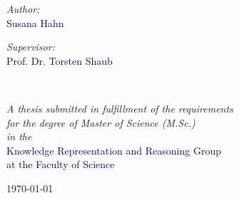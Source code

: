 \begin{titlepage}
\begin{center}
    \vspace*{.005\textheight}
    \begin{minipage}[t]{0.4\textwidth}
    \begin{flushleft} \large
    \emph{Author:}\\
    {\textcolor{darkblue}{Susana Hahn}}\\
    \end{flushleft}
    \end{minipage}
    \begin{minipage}[t]{0.4\textwidth}
    \begin{flushright} \large
    \emph{Supervisor:} \\
    {\textcolor{darkblue}{Prof. Dr. Torsten Shaub}}
    \end{flushright}
    \end{minipage}\\[2.3cm]
     
    \vfill
    
    \large \textit{A thesis submitted in fulfillment of the requirements\\ for the degree of Master of Science (M.Sc.)}\\[0.3cm]
    \textit{in the}\\[0.4cm]
    \textcolor{darkblue}{Knowledge Representation and Reasoning Group \\ at the Faculty of Science } \\[1cm]
     
    \vfill
    
    {\large \today}\\[4cm]
     
    \vfill
    \end{center}
    \end{titlepage}